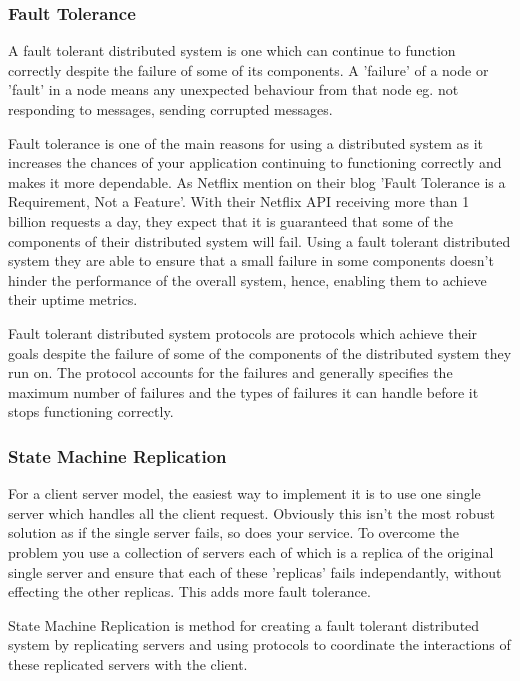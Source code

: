 \subsubsection{Fault Tolerance}
A fault tolerant distributed system is one which can continue to function correctly
despite the failure of some of its components. A 'failure' of a node or 'fault' in a node
means any unexpected behaviour from that node eg. not responding to messages, sending
corrupted messages.

Fault tolerance is one of the main reasons for using a distributed system as it
increases the chances of your application continuing to functioning correctly and
makes it more dependable. As Netflix mention on their blog
'Fault Tolerance is a Requirement, Not a Feature'.
With their Netflix API receiving more than 1 billion requests a day, they expect
that it is guaranteed that some of the components of their distributed system will fail.
Using a fault tolerant distributed system they are able to ensure that a small failure
in some components doesn't hinder the performance of the overall system, hence,
enabling them to achieve their uptime metrics.

Fault tolerant distributed system protocols are protocols which achieve their
goals despite the failure of some of the components of the distributed system they run on.
The protocol accounts for the failures and generally specifies the maximum number of
failures and the types of failures it can handle before it stops functioning correctly.

\subsubsection{State Machine Replication}

For a client server model, the easiest way to implement it is to use one single server
which handles all the client request. Obviously this isn't the most robust solution
as if the single server fails, so does your service. To overcome the problem you
use a collection of servers each of which is a replica of the original single server and
ensure that each of these 'replicas' fails independantly, without effecting the other replicas.
This adds more fault tolerance.

State Machine Replication is method for creating a fault tolerant distributed system
by replicating servers and using protocols to coordinate the interactions of these
replicated servers with the client.

